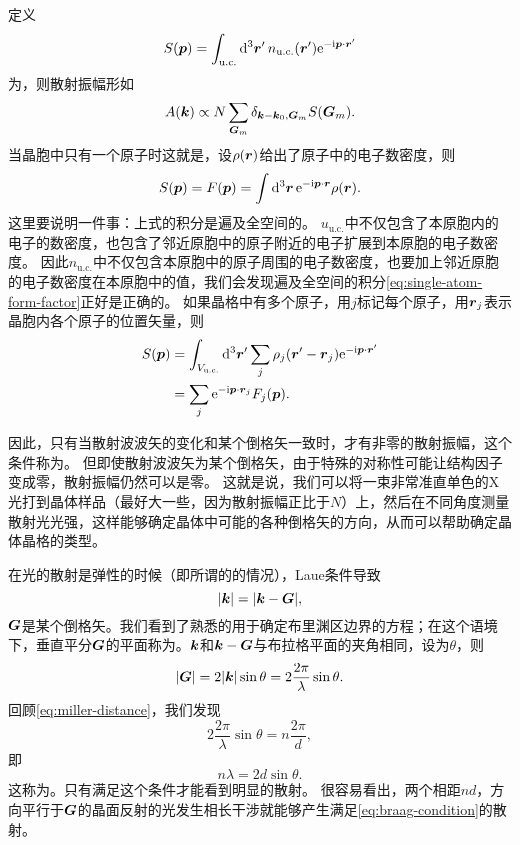 定义
\begin{equation}
    S(\vb*{p}) = \int_{\text{u.c.}} \dd[3]{\vb*{r}'} n_\text{u.c.}(\vb*{r}') \mathrm{e}^{-\mathrm{i} \vb*{p} \cdot \vb*{r}'}
\end{equation}
为，则散射振幅形如
\begin{equation}
    A(\vb*{k}) \propto N \sum_{\vb*{G}_m} \delta_{\vb*{k} - \vb*{k}_0, \vb*{G}_m} S(\vb*{G}_m).
\end{equation}
当晶胞中只有一个原子时这就是，设$\rho(\vb*{r})$给出了原子中的电子数密度，则
\begin{equation}
    S(\vb*{p}) = F(\vb*{p}) = \int \dd[3]{\vb*{r}} \mathrm{e}^{-\mathrm{i} \vb*{p} \cdot \vb*{r}} \rho(\vb*{r}).
    \label{eq:single-atom-form-factor}
\end{equation}
这里要说明一件事：上式的积分是遍及全空间的。
$u_\text{u.c.}$中不仅包含了本原胞内的电子的数密度，也包含了邻近原胞中的原子附近的电子扩展到本原胞的电子数密度。
因此$n_\text{u.c.}$中不仅包含本原胞中的原子周围的电子数密度，也要加上邻近原胞的电子数密度在本原胞中的值，我们会发现遍及全空间的积分\eqref{eq:single-atom-form-factor}正好是正确的。
如果晶格中有多个原子，用$j$标记每个原子，用$\vb*{r}_j$表示晶胞内各个原子的位置矢量，则
\begin{equation}
    \begin{aligned}
        S(\vb*{p}) &= \int_{V_{\text{u.c.}}} \dd[3]{\vb*{r}'} \sum_j \rho_j(\vb*{r}' - \vb*{r}_j) \mathrm{e}^{-\mathrm{i} \vb*{p} \cdot \vb*{r}'} \\
        &= \sum_j \mathrm{e}^{-\mathrm{i} \vb*{p} \cdot \vb*{r}_j} F_j(\vb*{p}).
    \end{aligned}
\end{equation}

因此，只有当散射波波矢的变化和某个倒格矢一致时，才有非零的散射振幅，这个条件称为。
但即使散射波波矢为某个倒格矢，由于特殊的对称性可能让结构因子变成零，散射振幅仍然可以是零。
这就是说，我们可以将一束非常准直单色的X光打到晶体样品（最好大一些，因为散射振幅正比于$N$）上，然后在不同角度测量散射光光强，这样能够确定晶体中可能的各种倒格矢的方向，从而可以帮助确定晶体晶格的类型。

在光的散射是弹性的时候（即所谓的的情况），Laue条件导致
\[
    \abs{\vb*{k}} = \abs{\vb*{k} - \vb*{G}},
\]
$\vb*{G}$是某个倒格矢。我们看到了熟悉的用于确定布里渊区边界的方程；在这个语境下，垂直平分$\vb*{G}$的平面称为。$\vb*{k}$和$\vb*{k} - \vb*{G}$与布拉格平面的夹角相同，设为$\theta$，则
\[
    \abs{\vb*{G}} = 2 \abs{\vb*{k}} \sin \theta = 2 \frac{2\pi}{\lambda} \sin \theta.
\]
回顾\eqref{eq:miller-distance}，我们发现
\[
    2 \frac{2\pi}{\lambda} \sin \theta = n \frac{2\pi}{d}, 
\]
即
\begin{equation}
    n \lambda = 2 d \sin \theta.
    \label{eq:braag-condition}
\end{equation}
这称为。只有满足这个条件才能看到明显的散射。
很容易看出，两个相距$nd$，方向平行于$\vb*{G}$的晶面反射的光发生相长干涉就能够产生满足\eqref{eq:braag-condition}的散射。


